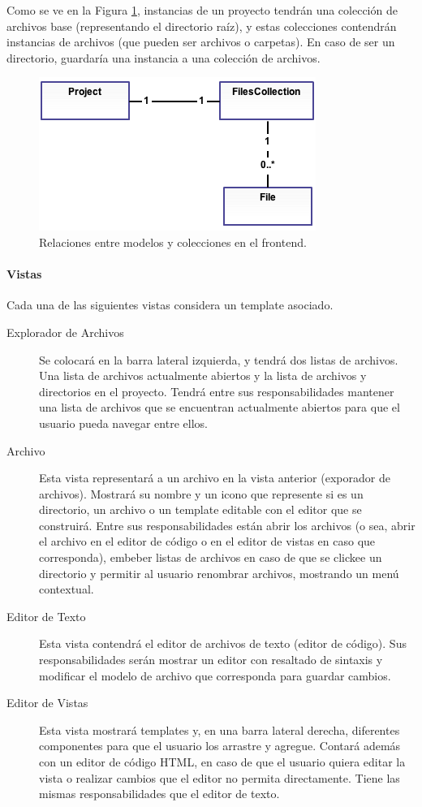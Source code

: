 \documentclass[12pt,spanish,letter]{report}
\makeatletter
\def\maxwidth{\ifdim\Gin@nat@width>\linewidth\linewidth
\else\Gin@nat@width\fi}
\let\Oldincludegraphics\includegraphics
\renewcommand{\includegraphics}[1]{\Oldincludegraphics[width=\maxwidth]{#1}}
\makeatother
\begin{document}
Como se ve en la Figura \ref{figures:frontend-models}, instancias de un
proyecto tendrán una colección de archivos base (representando el
directorio raíz), y estas colecciones contendrán instancias de archivos
(que pueden ser archivos o carpetas). En caso de ser un directorio,
guardaría una instancia a una colección de archivos.

\begin{figure}[htbp]
\centering
\includegraphics{figures/frontend-models.png}
\caption{Relaciones entre modelos y colecciones en el frontend.
\label{figures:frontend-models}}
\end{figure}

\paragraph{Vistas}

Cada una de las siguientes vistas considera un template asociado.

\begin{description}
\item[Explorador de Archivos]
Se colocará en la barra lateral izquierda, y tendrá dos listas de
archivos. Una lista de archivos actualmente abiertos y la lista de
archivos y directorios en el proyecto. Tendrá entre sus
responsabilidades mantener una lista de archivos que se encuentran
actualmente abiertos para que el usuario pueda navegar entre ellos.
\item[Archivo]
Esta vista representará a un archivo en la vista anterior (exporador de
archivos). Mostrará su nombre y un icono que represente si es un
directorio, un archivo o un template editable con el editor que se
construirá. Entre sus responsabilidades están abrir los archivos (o sea,
abrir el archivo en el editor de código o en el editor de vistas en caso
que corresponda), embeber listas de archivos en caso de que se clickee
un directorio y permitir al usuario renombrar archivos, mostrando un
menú contextual.
\item[Editor de Texto]
Esta vista contendrá el editor de archivos de texto (editor de código).
Sus responsabilidades serán mostrar un editor con resaltado de sintaxis
y modificar el modelo de archivo que corresponda para guardar cambios.
\item[Editor de Vistas]
Esta vista mostrará templates y, en una barra lateral derecha,
diferentes componentes para que el usuario los arrastre y agregue.
Contará además con un editor de código HTML, en caso de que el usuario
quiera editar la vista o realizar cambios que el editor no permita
directamente. Tiene las mismas responsabilidades que el editor de texto.
\end{description}
\end{document}
